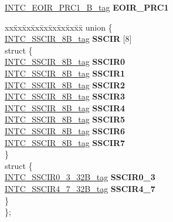 \begin{DoxyCompactItemize}
\begin{tabbing}
\end{tabbing}\item 
\mbox{\label{structINTC__struct__tag_ad2956dc2b44579a5811ddd83f75e6bfa}} 
\mbox{\hyperlink{unionINTC__EOIR__PRC1__32B__tag}{I\+N\+T\+C\+\_\+\+E\+O\+I\+R\+\_\+\+P\+R\+C1\+\_\+B\+\_\+tag}} {\bfseries E\+O\+I\+R\+\_\+\+P\+R\+C1}
\item 
\mbox{\label{structINTC__struct__tag_a93874c631a1977cd1aa034cd627fa263}} 
\begin{tabbing}
xx\=xx\=xx\=xx\=xx\=xx\=xx\=xx\=xx\=\kill
union \{\\
\>\mbox{\hyperlink{unionINTC__SSCIR__8B__tag}{INTC\_SSCIR\_8B\_tag}} {\bfseries SSCIR} \mbox{[}8\mbox{]}\\
\mbox{\label{unionINTC__struct__tag_1_1_0D2289_a6eac17ce63fa850a4b6b74d882e9f6be}} 
\>struct \{\\
\>\>\mbox{\hyperlink{unionINTC__SSCIR__8B__tag}{INTC\_SSCIR\_8B\_tag}} {\bfseries SSCIR0}\\
\>\>\mbox{\hyperlink{unionINTC__SSCIR__8B__tag}{INTC\_SSCIR\_8B\_tag}} {\bfseries SSCIR1}\\
\>\>\mbox{\hyperlink{unionINTC__SSCIR__8B__tag}{INTC\_SSCIR\_8B\_tag}} {\bfseries SSCIR2}\\
\>\>\mbox{\hyperlink{unionINTC__SSCIR__8B__tag}{INTC\_SSCIR\_8B\_tag}} {\bfseries SSCIR3}\\
\>\>\mbox{\hyperlink{unionINTC__SSCIR__8B__tag}{INTC\_SSCIR\_8B\_tag}} {\bfseries SSCIR4}\\
\>\>\mbox{\hyperlink{unionINTC__SSCIR__8B__tag}{INTC\_SSCIR\_8B\_tag}} {\bfseries SSCIR5}\\
\>\>\mbox{\hyperlink{unionINTC__SSCIR__8B__tag}{INTC\_SSCIR\_8B\_tag}} {\bfseries SSCIR6}\\
\>\>\mbox{\hyperlink{unionINTC__SSCIR__8B__tag}{INTC\_SSCIR\_8B\_tag}} {\bfseries SSCIR7}\\
\>\} \\
\mbox{\label{unionINTC__struct__tag_1_1_0D2289_acb31da4e0cc909316a87b9675fb5a90d}} 
\>struct \{\\
\>\>\mbox{\hyperlink{unionINTC__SSCIR0__3__32B__tag}{INTC\_SSCIR0\_3\_32B\_tag}} {\bfseries SSCIR0\_3}\\
\>\>\mbox{\hyperlink{unionINTC__SSCIR4__7__32B__tag}{INTC\_SSCIR4\_7\_32B\_tag}} {\bfseries SSCIR4\_7}\\
\>\} \\
\}; \\


\end{tabbing}
\end{DoxyCompactItemize}
